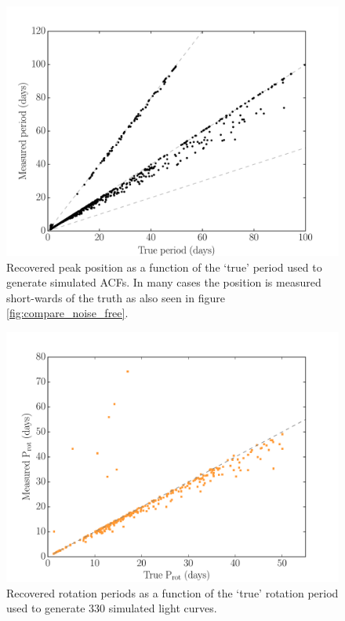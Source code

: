 \begin{figure}
\begin{center}
\includegraphics[width=6in, clip=true]{figures/exp_sine_test.pdf}
\caption{Recovered peak position as a function of the `true' period used to
generate simulated ACFs. In many cases the position is measured short-wards of
the truth as also seen in figure \ref{fig:compare_noise_free}.}
\end{center}
\end{figure}
\label{fig:exp_sine_test}

\begin{figure}
\begin{center}
\includegraphics[width=6in, clip=true]{figures/acf_compare_noise-free.pdf}
\caption{Recovered rotation periods as a function of the `true' rotation
period used to generate 330 simulated light curves.}
\end{center}
\end{figure}
\label{fig:compare_noise_free}

